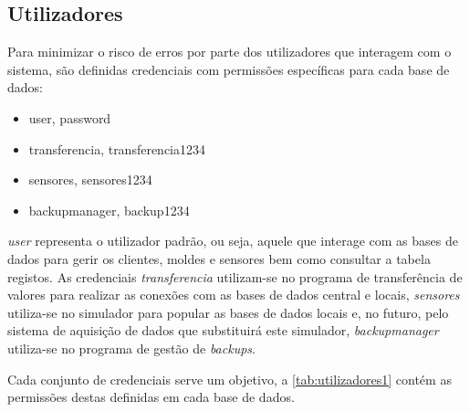 \documentclass[11pt,twoside,a4paper]{report}
\begin{document}
\subsection{Utilizadores}
Para minimizar o risco de erros por parte dos utilizadores que interagem com o sistema, são definidas credenciais com permissões específicas para cada base de dados:
\begin{itemize}[noitemsep]
	\item user, password
	\item transferencia, transferencia1234
	\item sensores, sensores1234
	\item backupmanager, backup1234
\end{itemize}
\textit{user} representa o utilizador padrão, ou seja, aquele que interage com as bases de dados para gerir os clientes, moldes e sensores bem como consultar a tabela registos. As credenciais \textit{transferencia} utilizam-se no programa de transferência de valores para realizar as conexões com as bases de dados central e locais, \textit{sensores} utiliza-se no simulador para popular as bases de dados locais e, no futuro, pelo sistema de aquisição de dados que substituirá este simulador, \textit{backupmanager} utiliza-se no programa de gestão de \textit{backups}.\par 
Cada conjunto de credenciais serve um objetivo, a \autoref{tab:utilizadores1} contém as permissões destas definidas em cada base de dados.
\end{document}
